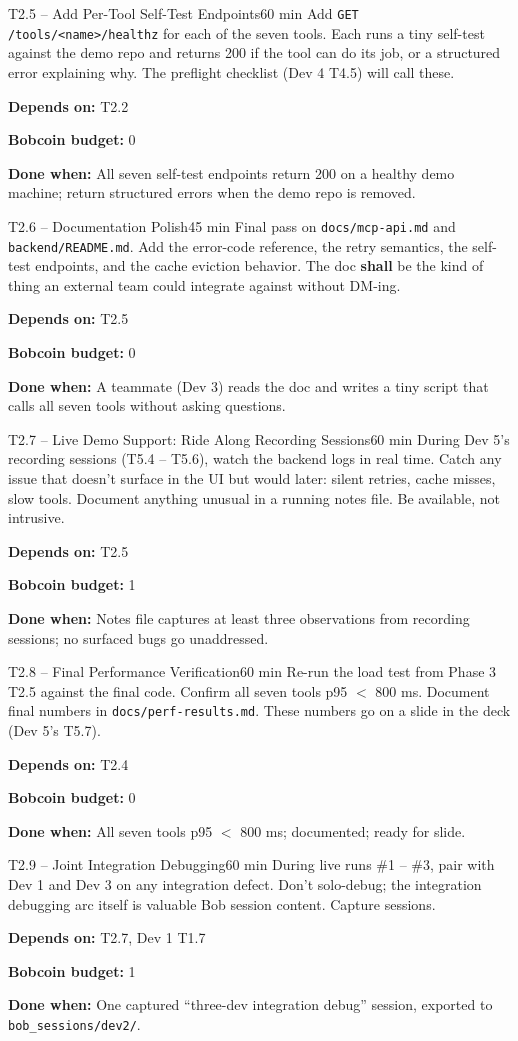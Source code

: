 \documentclass[11pt,letterpaper]{article}
\newcommand{\acceptance}[1]{\par\smallskip\textcolor{ibmgreen}{\textbf{Done when:}} #1}
\newcommand{\depends}[1]{\par\smallskip\textcolor{ibmorange}{\textbf{Depends on:}} #1}
\newcommand{\bobcost}[1]{\par\smallskip\textcolor{ibmaccent}{\textbf{Bobcoin budget:}} #1}
\newcommand{\shall}{\textbf{shall}}
\begin{document}
\begin{task}{T2.5 -- Add Per-Tool Self-Test Endpoints}{60 min}
Add \texttt{GET /tools/<name>/healthz} for each of the seven tools. Each runs a tiny self-test against the demo repo and returns 200 if the tool can do its job, or a structured error explaining why. The preflight checklist (Dev 4 T4.5) will call these.
\depends{T2.2}
\bobcost{0}
\acceptance{All seven self-test endpoints return 200 on a healthy demo machine; return structured errors when the demo repo is removed.}
\end{task}

\begin{task}{T2.6 -- Documentation Polish}{45 min}
Final pass on \texttt{docs/mcp-api.md} and \texttt{backend/README.md}. Add the error-code reference, the retry semantics, the self-test endpoints, and the cache eviction behavior. The doc \shall{} be the kind of thing an external team could integrate against without DM-ing.
\depends{T2.5}
\bobcost{0}
\acceptance{A teammate (Dev 3) reads the doc and writes a tiny script that calls all seven tools without asking questions.}
\end{task}

\begin{task}{T2.7 -- Live Demo Support: Ride Along Recording Sessions}{60 min}
During Dev 5's recording sessions (T5.4 -- T5.6), watch the backend logs in real time. Catch any issue that doesn't surface in the UI but would later: silent retries, cache misses, slow tools. Document anything unusual in a running notes file. Be available, not intrusive.
\depends{T2.5}
\bobcost{1}
\acceptance{Notes file captures at least three observations from recording sessions; no surfaced bugs go unaddressed.}
\end{task}

\begin{task}{T2.8 -- Final Performance Verification}{60 min}
Re-run the load test from Phase 3 T2.5 against the final code. Confirm all seven tools p95 $<$ 800 ms. Document final numbers in \texttt{docs/perf-results.md}. These numbers go on a slide in the deck (Dev 5's T5.7).
\depends{T2.4}
\bobcost{0}
\acceptance{All seven tools p95 $<$ 800 ms; documented; ready for slide.}
\end{task}

\begin{task}{T2.9 -- Joint Integration Debugging}{60 min}
During live runs \#1 -- \#3, pair with Dev 1 and Dev 3 on any integration defect. Don't solo-debug; the integration debugging arc itself is valuable Bob session content. Capture sessions.
\depends{T2.7, Dev 1 T1.7}
\bobcost{1}
\acceptance{One captured ``three-dev integration debug'' session, exported to \texttt{bob\_sessions/dev2/}.}
\end{task}
\end{document}
